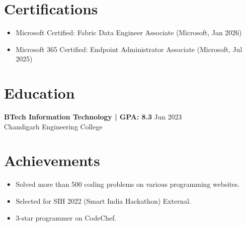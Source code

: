 \documentclass[11pt,a4paper]{article}
\begin{document}
\section{Certifications}
\begin{itemize}
  \item Microsoft Certified: Fabric Data Engineer Associate (Microsoft, Jan 2026)
  \item Microsoft 365 Certified: Endpoint Administrator Associate (Microsoft, Jul 2025)
\end{itemize}

\section{Education}
\textbf{BTech Information Technology | GPA: 8.3} \hfill Jun 2023
\\ Chandigarh Engineering College
\vspace{2pt}

\section{Achievements}
\begin{itemize}
  \item Solved more than 500 coding problems on various programming websites.
  \item Selected for SIH 2022 (Smart India Hackathon) External.
  \item 3-star programmer on CodeChef.
\end{itemize}
\end{document}
